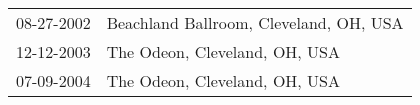 \begin{supertabular}{ll}
 08-27-2002 &  Beachland Ballroom, Cleveland, OH, USA \\
 12-12-2003 &           The Odeon, Cleveland, OH, USA \\
 07-09-2004 &           The Odeon, Cleveland, OH, USA \\
\end{supertabular}
